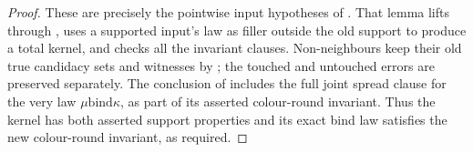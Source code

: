 \begin{proof}
These are precisely the pointwise input hypotheses of
. That lemma lifts through
, uses a supported input's law
as filler outside the old support to produce a total kernel, and checks
all the invariant clauses. Non-neighbours keep their old true candidacy
sets and witnesses by ;
the touched and untouched errors are preserved separately.
The conclusion of  includes the
full joint spread clause for the very law
\(\mu\mathbin{\mathrm{bind}}\kappa\), as part of its asserted
colour-round invariant.
Thus the kernel has both asserted support properties and its exact bind
law satisfies the new colour-round invariant, as required.
\end{proof}
